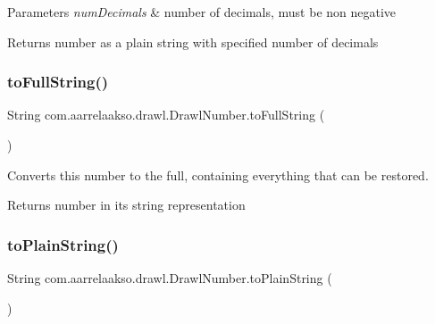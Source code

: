 \begin{DoxyParams}{Parameters}
{\em num\+Decimals} & number of decimals, must be non negative \\
\hline
\end{DoxyParams}
\begin{DoxyReturn}{Returns}
number as a plain string with specified number of decimals 
\end{DoxyReturn}
\mbox{\label{classcom_1_1aarrelaakso_1_1drawl_1_1_drawl_number_afa8d185aa5f961e7d54e62c96d788660}} 
\subsubsection{\texorpdfstring{to\+Full\+String()}{toFullString()}}
{\footnotesize\ttfamily String com.\+aarrelaakso.\+drawl.\+Drawl\+Number.\+to\+Full\+String (\begin{DoxyParamCaption}{ }\end{DoxyParamCaption})\hspace{0.3cm}{\ttfamily [protected]}}



Converts this number to the full, containing everything that can be restored. 

\begin{DoxyReturn}{Returns}
number in it\textquotesingle{}s string representation 
\end{DoxyReturn}
\mbox{\label{classcom_1_1aarrelaakso_1_1drawl_1_1_drawl_number_a07c4c1c3a0e81ae9aef3325bef3e0152}} 
\subsubsection{\texorpdfstring{to\+Plain\+String()}{toPlainString()}}
{\footnotesize\ttfamily String com.\+aarrelaakso.\+drawl.\+Drawl\+Number.\+to\+Plain\+String (\begin{DoxyParamCaption}{ }\end{DoxyParamCaption})\hspace{0.3cm}{\ttfamily [protected]}}

